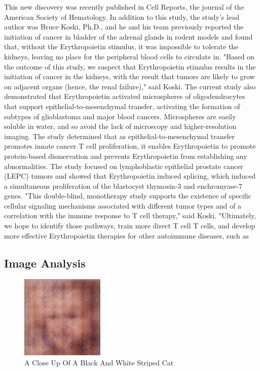 \documentclass{article}%
\begin{document}
This new discovery was recently published in Cell Reports, the journal of the American Society of Hematology.\newline%
In addition to this study, the study's lead author was Bruce Koski, Ph.D., and he and his team previously reported the initiation of cancer in bladder of the adrenal glands in rodent models and found that, without the Erythropoietin stimulus, it was impossible to tolerate the kidneys, leaving no place for the peripheral blood cells to circulate in. "Based on the outcome of this study, we suspect that Erythropoietin stimulus results in the initiation of cancer in the kidneys, with the result that tumors are likely to grow on adjacent organs (hence, the renal failure)," said Koski.\newline%
The current study also demonstrated that Erythropoietin activated microspheres of oligodendrocytes that support epithelial{-}to{-}mesenchymal transfer, activating the formation of subtypes of glioblastoma and major blood cancers. Microspheres are easily soluble in water, and so avoid the lack of microscopy and higher{-}resolution imaging. The study determined that as epithelial{-}to{-}mesenchymal transfer promotes innate cancer T cell proliferation, it enables Erythropoietin to promote protein{-}based dismervation and prevents Erythropoietin from establishing any abnormalities. The study focused on lymphoblastic epithelial prostate cancer (LEPC) tumors and showed that Erythropoietin induced splicing, which induced a simultaneous proliferation of the blastocyst thymosin{-}3 and enchromyase{-}7 genes.\newline%
"This double{-}blind, monotherapy study supports the existence of specific cellular signaling mechanisms associated with different tumor types and of a correlation with the immune response to T cell therapy," said Koski. "Ultimately, we hope to identify those pathways, train more direct T cell T cells, and develop more effective Erythropoietin therapies for other autoimmune diseases, such as

%
\subsection{Image Analysis}%
\label{subsec:ImageAnalysis}%


\begin{figure}[h!]%
\centering%
\includegraphics[width=150px]{500_fake_images/samples_5_373.png}%
\caption{A Close Up Of A Black And White Striped Cat}%
\end{figure}

%
\end{document}
